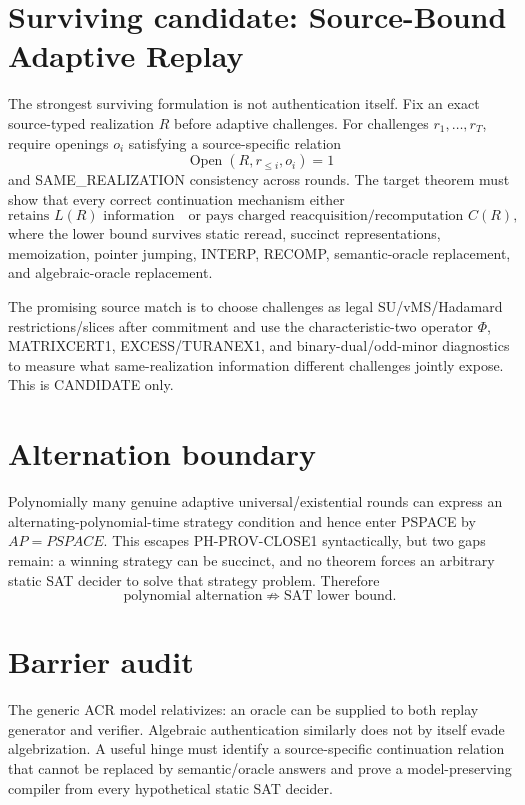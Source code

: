 \documentclass[11pt]{article}
\begin{document}
\section*{Surviving candidate: Source-Bound Adaptive Replay}
The strongest surviving formulation is not authentication itself. Fix an exact source-typed realization $R$ before adaptive challenges. For challenges $r_1,\ldots,r_T$, require openings $o_i$ satisfying a source-specific relation
\[
\operatorname{Open}(R,r_{\le i},o_i)=1
\]
and SAME\_REALIZATION consistency across rounds. The target theorem must show that every correct continuation mechanism either
\[
\text{retains }L(R)\text{ information}
\quad\text{or pays charged reacquisition/recomputation }C(R),
\]
where the lower bound survives static reread, succinct representations, memoization, pointer jumping, INTERP, RECOMP, semantic-oracle replacement, and algebraic-oracle replacement.

The promising source match is to choose challenges as legal SU/vMS/Hadamard restrictions/slices after commitment and use the characteristic-two operator $\Phi$, MATRIXCERT1, EXCESS/TURANEX1, and binary-dual/odd-minor diagnostics to measure what same-realization information different challenges jointly expose. This is CANDIDATE only.

\section*{Alternation boundary}
Polynomially many genuine adaptive universal/existential rounds can express an alternating-polynomial-time strategy condition and hence enter PSPACE by $AP=PSPACE$. This escapes PH-PROV-CLOSE1 syntactically, but two gaps remain: a winning strategy can be succinct, and no theorem forces an arbitrary static SAT decider to solve that strategy problem. Therefore
\[
\boxed{\text{polynomial alternation}\not\Rightarrow\text{SAT lower bound}.}
\]

\section*{Barrier audit}
The generic ACR model relativizes: an oracle can be supplied to both replay generator and verifier. Algebraic authentication similarly does not by itself evade algebrization. A useful hinge must identify a source-specific continuation relation that cannot be replaced by semantic/oracle answers and prove a model-preserving compiler from every hypothetical static SAT decider.
\end{document}
